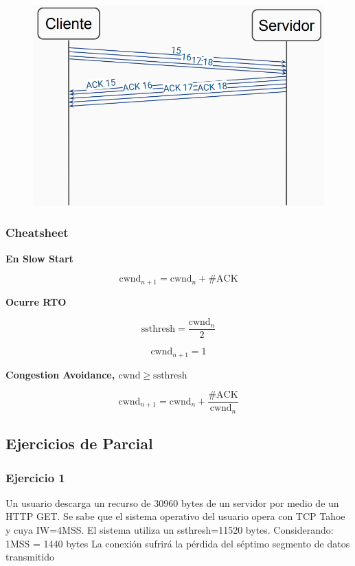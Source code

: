 \documentclass[titlepage,a4paper]{article}
\begin{document}
\begin{figure}[H]
\centering
\includegraphics[width=\textwidth]{imagenes/postCongA.png}
\end{figure}

\subsubsection{Cheatsheet}

\textbf{En Slow Start}

$$ \mathrm{cwnd}_{n+1} = \mathrm{cwnd}_{n} + \#\mathrm{ACK} $$

\textbf{Ocurre RTO}

$$ \mathrm{ssthresh} = \frac{\mathrm{cwnd}_n}{2} $$

$$ \mathrm{cwnd}_{n+1} = 1  $$

\textbf{Congestion Avoidance, $\mathrm{cwnd} \geq \mathrm{ssthresh} $}

$$ \mathrm{cwnd}_{n+1} = \mathrm{cwnd}_n + \frac{\#\mathrm{ACK}}{\mathrm{cwnd}_n} $$


\subsection{Ejercicios de Parcial}

\subsubsection{Ejercicio 1}

Un usuario descarga un recurso de 30960 bytes de un servidor por medio de un HTTP GET. Se sabe que el sistema operativo del usuario opera con TCP Tahoe y cuya IW=4MSS. El sistema utiliza un ssthresh=11520 bytes. Considerando: 1MSS = 1440 bytes
La conexión sufrirá la pérdida del séptimo segmento de datos transmitido \\
\end{document}
